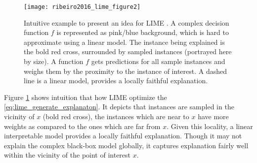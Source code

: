 \documentclass[english]{tktltiki2}
\theoremstyle{definition}
\theoremstyle{remark}
\begin{document}
\begin{figure}[H]
	\centering
	\vspace*{-2mm}
	\texttt{[image: ribeiro2016\_lime\_figure2]}
	\vspace*{-10mm}
	\caption{Intuitive example to present an idea for LIME  \citep{ribeiro2016should}. A complex decision function $f$ is represented as pink/blue background, which is hard to approximate using a linear model. The instance being explained is the bold red cross, surrounded by sampled instances (portrayed here by size). A function $f$ gets predictions for all sample instances and weighs them by the proximity to the instance of interest. A dashed line is a linear model, provides a locally faithful explanation. }
	\label{fig:ribeiro2016_lime_figure2}
\end{figure}

Figure \ref{fig:ribeiro2016_lime_figure2} shows intuition that how LIME \citep{ribeiro2016should} optimize the \eqref{eq:lime_generate_explanaton}. It depicts that instances are sampled in the vicinity of $x$ (bold red cross), the instances which are near to $x$ have more weights as compared to the ones which are far from $x$. Given this locality, a linear interpretable model provides a locally faithful explanation. Though it may not explain the complex black-box model globally, it captures explanation fairly well within the vicinity of the point of interest $x$. 



\end{document}
